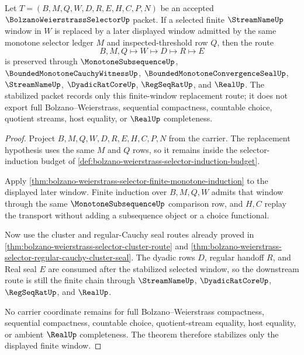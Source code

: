 \begin{theorem}
\label{thm:bolzano-weierstrass-selector-finite-window-stabilization}
Let $T=(B,M,Q,W,D,R,E,H,C,P,N)$ be an accepted
$\BolzanoWeierstrassSelectorUp$ packet. If a selected finite
$\StreamNameUp$ window in $W$ is replaced by a later displayed window admitted
by the same monotone selector ledger $M$ and inspected-threshold row $Q$, then
the route
$$
B,M,Q\longmapsto W\longmapsto D\longmapsto R\longmapsto E
$$
is preserved through $\MonotoneSubsequenceUp$,
$\BoundedMonotoneCauchyWitnessUp$,
$\BoundedMonotoneConvergenceSealUp$, $\StreamNameUp$,
$\DyadicRatCoreUp$, $\RegSeqRatUp$, and $\RealUp$. The stabilized packet
records only this finite-window replacement route; it does not export full
Bolzano--Weierstrass, sequential compactness, countable choice, quotient
streams, host equality, or $\RealUp$ completeness.
\end{theorem}
\begin{proof}
Project $B,M,Q,W,D,R,E,H,C,P,N$ from the carrier. The replacement hypothesis
uses the same $M$ and $Q$ rows, so it remains inside the selector-induction
budget of \autoref{def:bolzano-weierstrass-selector-induction-budget}.

Apply \autoref{thm:bolzano-weierstrass-selector-finite-monotone-induction} to
the displayed later window. Finite induction over $B,M,Q,W$ admits that window
through the same $\MonotoneSubsequenceUp$ comparison row, and $H,C$ replay the
transport without adding a subsequence object or a choice functional.

Now use the cluster and regular-Cauchy seal routes already proved in
\autoref{thm:bolzano-weierstrass-selector-cluster-route} and
\autoref{thm:bolzano-weierstrass-selector-regular-cauchy-cluster-seal}. The
dyadic rows $D$, regular handoff $R$, and Real seal $E$ are consumed after the
stabilized selected window, so the downstream route is still the finite chain
through $\StreamNameUp$, $\DyadicRatCoreUp$, $\RegSeqRatUp$, and $\RealUp$.

No carrier coordinate remains for full Bolzano--Weierstrass compactness,
sequential compactness, countable choice, quotient-stream equality, host
equality, or ambient $\RealUp$ completeness. The theorem therefore stabilizes
only the displayed finite window.
\end{proof}

